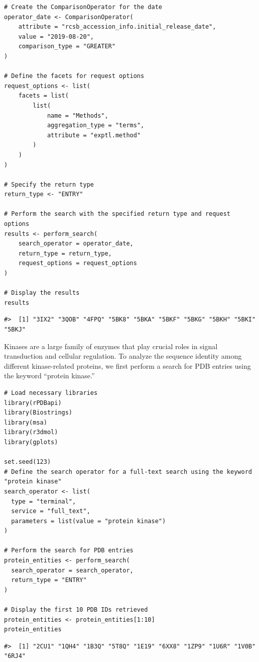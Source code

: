 \begin{verbatim}
# Create the ComparisonOperator for the date
operator_date <- ComparisonOperator(
    attribute = "rcsb_accession_info.initial_release_date",
    value = "2019-08-20",
    comparison_type = "GREATER"
)

# Define the facets for request options
request_options <- list(
    facets = list(
        list(
            name = "Methods",
            aggregation_type = "terms",
            attribute = "exptl.method"
        )
    )
)

# Specify the return type
return_type <- "ENTRY"

# Perform the search with the specified return type and request options
results <- perform_search(
    search_operator = operator_date,
    return_type = return_type,
    request_options = request_options
)

# Display the results
results
\end{verbatim}

\begin{verbatim}
#>  [1] "3IX2" "3QOB" "4FPQ" "5BK8" "5BKA" "5BKF" "5BKG" "5BKH" "5BKI" "5BKJ"
\end{verbatim}

Kinases are a large family of enzymes that play crucial roles in signal transduction and cellular regulation. To analyze the sequence identity among different kinase-related proteins, we first perform a search for PDB entries using the keyword ``protein kinase.''

\begin{verbatim}
# Load necessary libraries
library(rPDBapi)
library(Biostrings)
library(msa)
library(r3dmol)
library(gplots)

set.seed(123)
# Define the search operator for a full-text search using the keyword "protein kinase"
search_operator <- list(
  type = "terminal",
  service = "full_text",
  parameters = list(value = "protein kinase")
)

# Perform the search for PDB entries
protein_entities <- perform_search(
  search_operator = search_operator,
  return_type = "ENTRY"
)

# Display the first 10 PDB IDs retrieved
protein_entities <- protein_entities[1:10]
protein_entities
\end{verbatim}

\begin{verbatim}
#>  [1] "2CU1" "1QH4" "1B3Q" "5T8Q" "1E19" "6XX8" "1ZP9" "1U6R" "1V0B" "6RJ4"
\end{verbatim}

